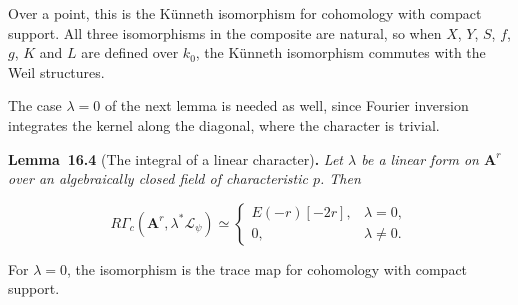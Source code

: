 \documentclass[11pt]{article}
\newenvironment{bpstatement}[2]{\par\addvspace{0.6\baselineskip}\noindent\textbf{#1}#2\textbf{.}\enspace\ignorespaces}
  {\par\addvspace{0.4\baselineskip}}
\newenvironment{bpstatementit}[2]{\begin{bpstatement}{#1}{#2}\itshape\ignorespaces}{\end{bpstatement}}
\begin{document}
\label{bp12}%
Over a point, this is the Künneth isomorphism for cohomology with compact support. All three isomorphisms in the composite are natural, so when \(X\), \(Y\), \(S\), \(f\), \(g\), \(K\) and \(L\) are defined over \(k_0\), the Künneth isomorphism commutes with the Weil structures.

The case \(\lambda=0\) of the next lemma is needed as well, since Fourier inversion integrates the kernel along the diagonal, where the character is trivial.

\label{bp13}%
\begin{bpstatementit}{Lemma~16.4}{ (The integral of a linear character)}
Let \(\lambda\) be a linear form on \(\mathbf A^r\) over an algebraically closed field of characteristic \(p\). Then

\[
R\Gamma_c(\mathbf A^r,\lambda^*\mathcal L_\psi)
\simeq
\begin{cases}
E(-r)[-2r],&\lambda=0,\\
0,&\lambda\ne0.
\end{cases}
\]

For \(\lambda=0\), the isomorphism is the trace map for cohomology with compact support.
\end{bpstatementit}
\end{document}
